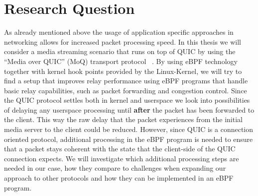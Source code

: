 \section{Research Question}\label{sec:research_question}

As already mentioned above the usage of application specific approaches in networking allows for increased packet processing speed.
In this thesis we will consider a media streaming scenario that runs on top of QUIC by using the ``Media over QUIC'' (MoQ) transport protocol
~\parencite{draft-moqtransport}.
By using eBPF technology together with kernel hook points provided by the Linux-Kernel, we will try to find a setup that improves relay 
performance using eBPF programs that handle basic relay capabilities, such as packet forwarding and congestion control.
Since the QUIC protocol settles both in kernel and userspace we look into possibilities of delaying any userspace processing until \textbf{after} the
packet has been forwarded to the client.
This way the raw delay that the packet experiences from the initial media server to the client could be reduced. 
However, since QUIC is a connection oriented protocol, additional processing in the eBPF program is needed to ensure that a packet stays coherent 
with the state that the client-side of the QUIC connection expects.
We will investigate which additional processing steps are needed in our case, how they compare to challenges when expanding our approach to other
protocols and how they can be implemented in an eBPF program.
